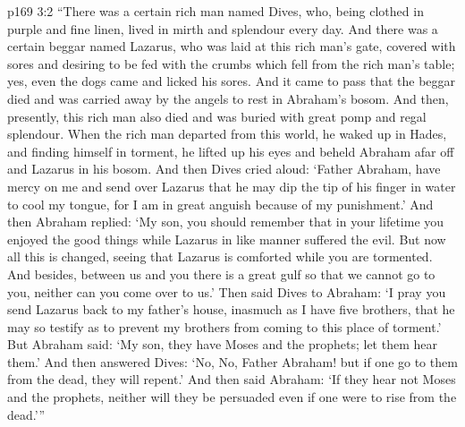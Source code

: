 \vs p169 3:2 “There was a certain rich man named Dives, who, being clothed in purple and fine linen, lived in mirth and splendour every day. And there was a certain beggar named Lazarus, who was laid at this rich man’s gate, covered with sores and desiring to be fed with the crumbs which fell from the rich man’s table; yes, even the dogs came and licked his sores. And it came to pass that the beggar died and was carried away by the angels to rest in Abraham’s bosom. And then, presently, this rich man also died and was buried with great pomp and regal splendour. When the rich man departed from this world, he waked up in Hades, and finding himself in torment, he lifted up his eyes and beheld Abraham afar off and Lazarus in his bosom. And then Dives cried aloud: ‘Father Abraham, have mercy on me and send over Lazarus that he may dip the tip of his finger in water to cool my tongue, for I am in great anguish because of my punishment.’ And then Abraham replied: ‘My son, you should remember that in your lifetime you enjoyed the good things while Lazarus in like manner suffered the evil. But now all this is changed, seeing that Lazarus is comforted while you are tormented. And besides, between us and you there is a great gulf so that we cannot go to you, neither can you come over to us.’ Then said Dives to Abraham: ‘I pray you send Lazarus back to my father’s house, inasmuch as I have five brothers, that he may so testify as to prevent my brothers from coming to this place of torment.’ But Abraham said: ‘My son, they have Moses and the prophets; let them hear them.’ And then answered Dives: ‘No, No, Father Abraham! but if one go to them from the dead, they will repent.’ And then said Abraham: ‘If they hear not Moses and the prophets, neither will they be persuaded even if one were to rise from the dead.’”

